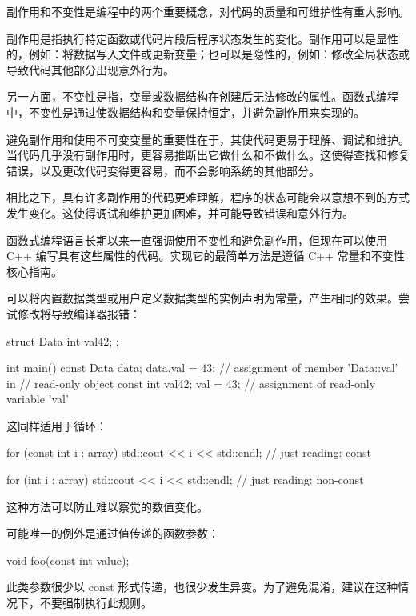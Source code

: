 
副作用和不变性是编程中的两个重要概念，对代码的质量和可维护性有重大影响。

副作用是指执行特定函数或代码片段后程序状态发生的变化。副作用可以是显性的，例如：将数据写入文件或更新变量；也可以是隐性的，例如：修改全局状态或导致代码其他部分出现意外行为。

另一方面，不变性是指，变量或数据结构在创建后无法修改的属性。函数式编程中，不变性是通过使数据结构和变量保持恒定，并避免副作用来实现的。

避免副作用和使用不可变变量的重要性在于，其使代码更易于理解、调试和维护。当代码几乎没有副作用时，更容易推断出它做什么和不做什么。这使得查找和修复错误，以及更改代码变得更容易，而不会影响系统的其他部分。

相比之下，具有许多副作用的代码更难理解，程序的状态可能会以意想不到的方式发生变化。这使得调试和维护更加困难，并可能导致错误和意外行为。

函数式编程语言长期以来一直强调使用不变性和避免副作用，但现在可以使用 C++ 编写具有这些属性的代码。实现它的最简单方法是遵循 C++ 常量和不变性核心指南。


可以将内置数据类型或用户定义数据类型的实例声明为常量，产生相同的效果。尝试修改将导致编译器报错：

\begin{cpp}
struct Data {
    int val{42};
};

int main() {
    const Data data;
    data.val = 43; // assignment of member 'Data::val' in
                   // read-only object
    const int val{42};
    val = 43; // assignment of read-only variable 'val'
}
\end{cpp}

这同样适用于循环：

\begin{cpp}
for (const int i : array) {
    std::cout << i << std::endl; // just reading: const
}

for (int i : array) {
    std::cout << i << std::endl; // just reading: non-const
}
\end{cpp}

这种方法可以防止难以察觉的数值变化。

可能唯一的例外是通过值传递的函数参数：

\begin{cpp}
void foo(const int value);
\end{cpp}

此类参数很少以 const 形式传递，也很少发生异变。为了避免混淆，建议在这种情况下，不要强制执行此规则。

